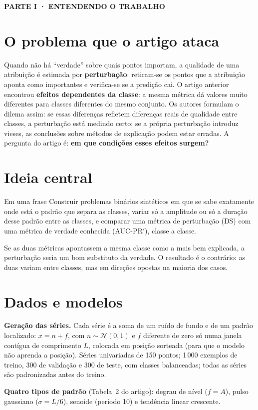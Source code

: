 \documentclass[11pt,a4paper]{article}
\newcommand{\partbar}[1]{\par\vspace{1.2em}\noindent\colorbox{black!80}{\parbox{\dimexpr\linewidth-2\fboxsep}{\color{white}\bfseries\sffamily\MakeUppercase{#1}}}\par\vspace{0.4em}}
\begin{document}
\partbar{Parte I · Entendendo o trabalho}

\section{O problema que o artigo ataca}
Quando não há “verdade” sobre quais pontos importam, a qualidade de uma atribuição é estimada por \textbf{perturbação}: retiram-se os pontos que a atribuição aponta como importantes e verifica-se se a predição cai. O artigo anterior encontrou \textbf{efeitos dependentes da classe}: a mesma métrica dá valores muito diferentes para classes diferentes do mesmo conjunto. Os autores formulam o dilema assim: se essas diferenças refletem diferenças reais de qualidade entre classes, a perturbação está medindo certo; se a própria perturbação introduz vieses, as conclusões sobre métodos de explicação podem estar erradas. A pergunta do artigo é: \textbf{em que condições esses efeitos surgem?}

\section{Ideia central}
\begin{infobox}[note]{Em uma frase}
Construir problemas binários sintéticos em que se sabe exatamente onde está o padrão que separa as classes, variar só a amplitude ou só a duração desse padrão entre as classes, e comparar uma métrica de perturbação (DS) com uma métrica de verdade conhecida (AUC-PR$'$), classe a classe.
\end{infobox}
Se as duas métricas apontassem a mesma classe como a mais bem explicada, a perturbação seria um bom substituto da verdade. O resultado é o contrário: as duas variam entre classes, mas em direções opostas na maioria dos casos.

\section{Dados e modelos}
\textbf{Geração das séries.} Cada série é a soma de um ruído de fundo e de um padrão localizado: $x = n + f$, com $n \sim \mathcal{N}(0,1)$ e $f$ diferente de zero só numa janela contígua de comprimento $L$, colocada em posição sorteada (para que o modelo não aprenda a posição). Séries univariadas de 150 pontos; 1\,000 exemplos de treino, 300 de validação e 300 de teste, com classes balanceadas; todas as séries são padronizadas antes do treino.

\textbf{Quatro tipos de padrão} (Tabela~2 do artigo): degrau de nível ($f = A$), pulso gaussiano ($\sigma = L/6$), senoide (período 10) e tendência linear crescente.
\end{document}
